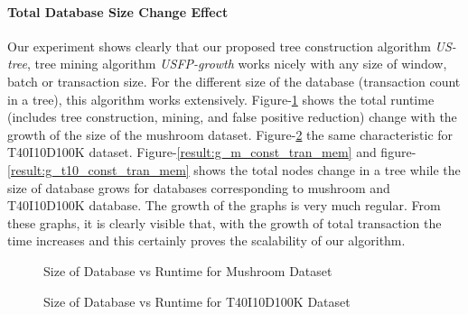     \paragraph{Total Database Size Change Effect}Our experiment shows clearly that our proposed tree construction algorithm \emph{US-tree}, tree mining algorithm \emph{USFP-growth} works nicely with any size of window, batch or transaction size. For the different size of the database (transaction count in a tree), this algorithm works extensively. Figure-\ref{result:g_m_const_tran} shows the total runtime (includes tree construction, mining, and false positive reduction) change with the growth of the size of the mushroom dataset. Figure-\ref{result:g_t10_const_tran} the same characteristic for T40I10D100K dataset. Figure-\ref{result:g_m_const_tran_mem} and figure-\ref{result:g_t10_const_tran_mem} shows the total nodes change in a tree while the size of database grows for databases corresponding to mushroom and T40I10D100K database. The growth of the graphs is very much regular. From these graphs, it is clearly visible that, with the growth of total transaction the time increases and this certainly proves the scalability of our algorithm. 
        \begin{figure}[h]
        \centering
            
        \caption{Size of Database vs Runtime for Mushroom Dataset }
        \label{result:g_m_const_tran}
        \end{figure}
        \begin{figure}[h]
        \centering
            
        \caption{Size of Database vs Runtime for T40I10D100K Dataset }
        \label{result:g_t10_const_tran}
        \end{figure}
%            

